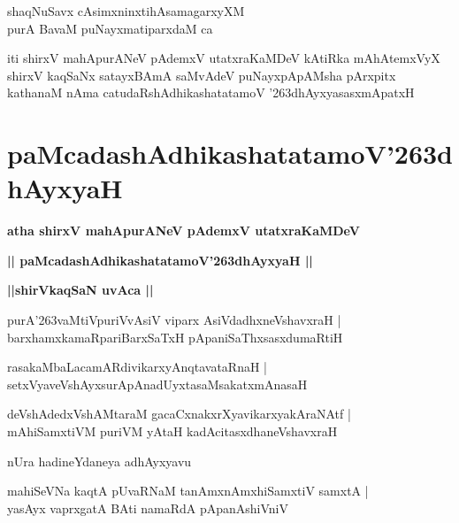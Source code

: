 \documentclass[twoside,12pt,openright]{book}
\def\S{\char'263}
\newcounter{shloka}[chapter]
\def\uvaca#1{\centerline{{\large\textbf{#1}}}}
\begin{document}
\begin{shloka}%
shaqNuSavx cAsimxninxtihAsamagarxyXM \\
purA BavaM puNayxmatiparxdaM ca 
\end{shloka}

\begin{center}
iti shirxV mahApurANeV pAdemxV utatxraKaMDeV kAtiRka mAhAtemxVyX shirxV kaqSaNx satayxBAmA 
saMvAdeV puNayxpApAMsha pArxpitx kathanaM nAma catudaRshAdhikashatatamoV \S dhAyxyasasxmApatxH 
\end{center}

\chapter{paMcadashAdhikashatatamoV\S dhAyxyaH}

\begin{center}
{\LARGE\bfseries atha shirxV mahApurANeV pAdemxV utatxraKaMDeV}
\end{center}

\begin{center}
{\LARGE\bfseries || paMcadashAdhikashatatamoV\S dhAyxyaH || }
\end{center}

\uvaca{||shirVkaqSaN uvAca ||}

\begin{shloka}%
purA\S vaMtiVpuriVvAsiV viparx AsiVdadhxneVshavxraH |\\
barxhamxkamaRpariBarxSaTxH pApaniSaThxsasxdumaRtiH
\end{shloka}

\begin{shloka}%
rasakaMbaLacamARdivikarxyAnqtavataRnaH |\\
setxVyaveVshAyxsurApAnadUyxtasaMsakatxmAnasaH 
\end{shloka}

\begin{shloka}%
deVshAdedxVshAMtaraM gacaCxnakxrXyavikarxyakAraNAtf |\\
mAhiSamxtiVM puriVM yAtaH kadAcitasxdhaneVshavxraH 
\end{shloka}

\begin{center}
nUra hadineYdaneya adhAyxyavu
\end{center}

\begin{shloka}%
mahiSeVNa kaqtA pUvaRNaM tanAmxnAmxhiSamxtiV samxtA |\\
yasAyx vaprxgatA BAti namaRdA pApanAshiVniV 
\end{shloka}
\end{document}
